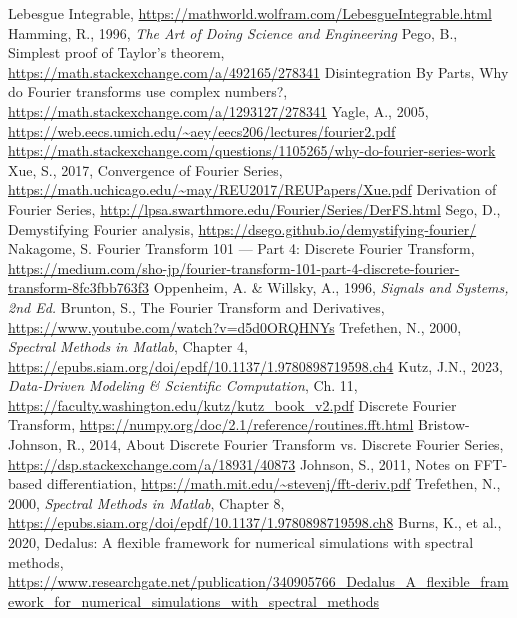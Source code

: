 \documentclass[10pt]{article}
\begin{document}
\begin{thebibliography}{99} %
\raggedright
{}
	Lebesgue Integrable, \url{https://mathworld.wolfram.com/LebesgueIntegrable.html}
	Hamming, R., 1996, \textit{The Art of Doing Science and Engineering}
	Pego, B., Simplest proof of Taylor's theorem, \url{https://math.stackexchange.com/a/492165/278341}
	Disintegration By Parts, Why do Fourier transforms use complex numbers?, \url{https://math.stackexchange.com/a/1293127/278341}
	Yagle, A., 2005, \url{https://web.eecs.umich.edu/~aey/eecs206/lectures/fourier2.pdf}
	\url{https://math.stackexchange.com/questions/1105265/why-do-fourier-series-work}
	Xue, S., 2017, Convergence of Fourier Series, \url{https://math.uchicago.edu/~may/REU2017/REUPapers/Xue.pdf}
	Derivation of Fourier Series, \url{http://lpsa.swarthmore.edu/Fourier/Series/DerFS.html}
	Sego, D., Demystifying Fourier analysis, \url{https://dsego.github.io/demystifying-fourier/}
	Nakagome, S. Fourier Transform 101 — Part 4: Discrete Fourier Transform, \url{https://medium.com/sho-jp/fourier-transform-101-part-4-discrete-fourier-transform-8fc3fbb763f3}
	Oppenheim, A. \& Willsky, A., 1996, \textit{Signals and Systems, 2nd Ed.}
	Brunton, S., The Fourier Transform and Derivatives, \url{https://www.youtube.com/watch?v=d5d0ORQHNYs}
	Trefethen, N., 2000, \textit{Spectral Methods in Matlab}, Chapter 4, \url{https://epubs.siam.org/doi/epdf/10.1137/1.9780898719598.ch4}
	Kutz, J.N., 2023, \textit{Data-Driven Modeling \& Scientific Computation}, Ch. 11, \url{https://faculty.washington.edu/kutz/kutz_book_v2.pdf}
	Discrete Fourier Transform, \url{https://numpy.org/doc/2.1/reference/routines.fft.html}
	Bristow-Johnson, R., 2014, About Discrete Fourier Transform vs. Discrete Fourier Series, \url{https://dsp.stackexchange.com/a/18931/40873}
	Johnson, S., 2011, Notes on FFT-based differentiation, \url{https://math.mit.edu/~stevenj/fft-deriv.pdf}
	Trefethen, N., 2000, \textit{Spectral Methods in Matlab}, Chapter 8, \url{https://epubs.siam.org/doi/epdf/10.1137/1.9780898719598.ch8}	
	Burns, K., et al., 2020, Dedalus: A flexible framework for numerical simulations with spectral methods, \url{https://www.researchgate.net/publication/340905766_Dedalus_A_flexible_framework_for_numerical_simulations_with_spectral_methods}

\end{thebibliography}
\end{document}
